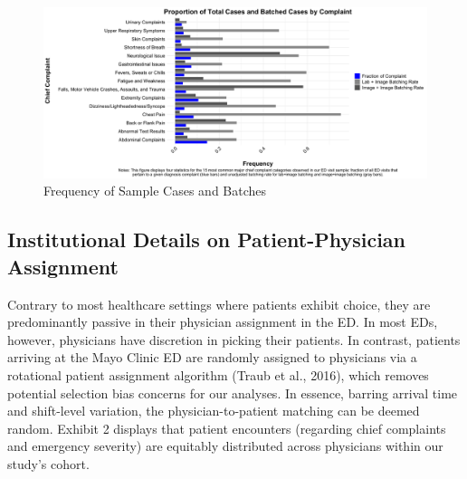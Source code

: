\documentclass[,,nonblindrev]{informs}
\begin{document}
\begin{figure}
\centering
\includegraphics[width=\textwidth,height=0.3\textheight]{../Manuscript/figures/fig1.png}
\caption{Frequency of Sample Cases and Batches}
\end{figure}

\hypertarget{institutional-details-on-patient-physician-assignment}{%
\subsection{Institutional Details on Patient-Physician
Assignment}\label{institutional-details-on-patient-physician-assignment}}

Contrary to most healthcare settings where patients exhibit choice, they
are predominantly passive in their physician assignment in the ED. In
most EDs, however, physicians have discretion in picking their patients.
In contrast, patients arriving at the Mayo Clinic ED are randomly
assigned to physicians via a rotational patient assignment algorithm
(Traub et al., 2016), which removes potential selection bias concerns
for our analyses. In essence, barring arrival time and shift-level
variation, the physician-to-patient matching can be deemed random.
Exhibit 2 displays that patient encounters (regarding chief complaints
and emergency severity) are equitably distributed across physicians
within our study's cohort.
\end{document}
